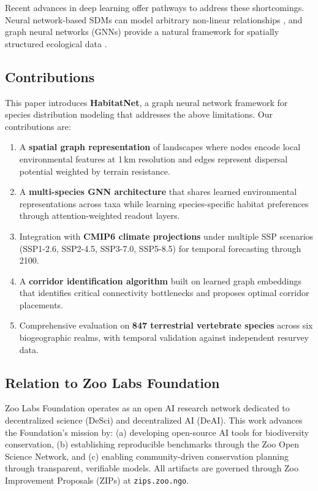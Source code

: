 Recent advances in deep learning offer pathways to address these
shortcomings. Neural network-based SDMs can model arbitrary non-linear
relationships \citep{botella2018deep, chen2020deep}, and graph neural
networks (GNNs) provide a natural framework for spatially structured
ecological data \citep{jetz2019essential}.

\subsection{Contributions}

This paper introduces \textbf{HabitatNet}, a graph neural network
framework for species distribution modeling that addresses the above
limitations. Our contributions are:

\begin{enumerate}
  \item A \textbf{spatial graph representation} of landscapes where
    nodes encode local environmental features at 1\,km resolution and
    edges represent dispersal potential weighted by terrain resistance.

  \item A \textbf{multi-species GNN architecture} that shares learned
    environmental representations across taxa while learning
    species-specific habitat preferences through attention-weighted
    readout layers.

  \item Integration with \textbf{CMIP6 climate projections} under
    multiple SSP scenarios (SSP1-2.6, SSP2-4.5, SSP3-7.0, SSP5-8.5)
    for temporal forecasting through 2100.

  \item A \textbf{corridor identification algorithm} built on learned
    graph embeddings that identifies critical connectivity bottlenecks
    and proposes optimal corridor placements.

  \item Comprehensive evaluation on \textbf{847 terrestrial vertebrate
    species} across six biogeographic realms, with temporal validation
    against independent resurvey data.
\end{enumerate}

\subsection{Relation to Zoo Labs Foundation}

Zoo Labs Foundation operates as an open AI research network dedicated to
decentralized science (DeSci) and decentralized AI (DeAI). This work
advances the Foundation's mission by: (a) developing open-source AI
tools for biodiversity conservation, (b) establishing reproducible
benchmarks through the Zoo Open Science Network, and (c) enabling
community-driven conservation planning through transparent, verifiable
models. All artifacts are governed through Zoo Improvement Proposals
(ZIPs) at \texttt{zips.zoo.ngo}.

